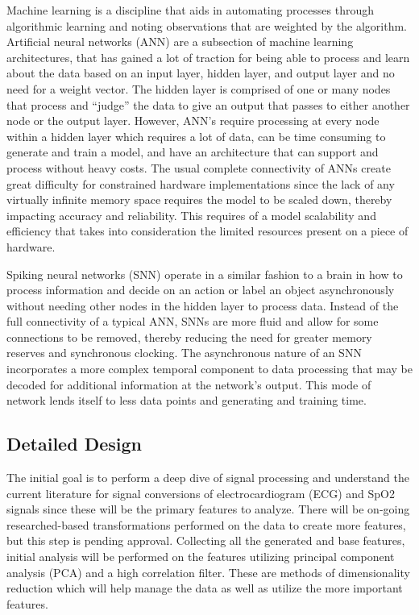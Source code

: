 \documentclass[12pt,titlepage]{article}
\begin{document}
Machine learning is a discipline that aids in automating processes through algorithmic learning and noting observations that are weighted by the
algorithm. Artificial neural networks (ANN) are a subsection of machine learning architectures, that has gained a lot of traction for being able
to process and learn about the data based on an input layer, hidden layer, and output layer and no need for a weight vector. The hidden layer is
comprised of one or many nodes that process and “judge” the data to give an output that passes to either another node or the output layer. However,
ANN’s require processing at every node within a hidden layer which requires a lot of data, can be time consuming to generate and train a model,
and have an architecture that can support and process without heavy costs. The usual complete connectivity of ANNs create great difficulty for
constrained hardware implementations since the lack of any virtually infinite memory space requires the model to be scaled down, thereby impacting
accuracy and reliability. This requires of a model scalability and efficiency that takes into consideration the limited resources present on a piece
of hardware.

Spiking neural networks (SNN) operate in a similar fashion to a brain in how to process information and decide on an action or label an object
asynchronously without needing other nodes in the hidden layer to process data. Instead of the full connectivity of a typical ANN, SNNs are more
fluid and allow for some connections to be removed, thereby reducing the need for greater memory reserves and synchronous clocking. The asynchronous
nature of an SNN incorporates a more complex temporal component to data processing that may be decoded for additional information at the network’s
output. This mode of network lends itself to less data points and generating and training time.

\subsection{Detailed Design}
The initial goal is to perform a deep dive of signal processing and understand the current literature for signal conversions of
electrocardiogram (ECG) and SpO2 signals since these will be the primary features to analyze. There will be on-going researched-based
transformations performed on the data to create more features, but this step is pending approval. Collecting all the generated and
base features, initial analysis will be performed on the features utilizing principal component analysis (PCA) and a high correlation
filter. These are methods of dimensionality reduction which will help manage the data as well as utilize the more important features.
\end{document}
